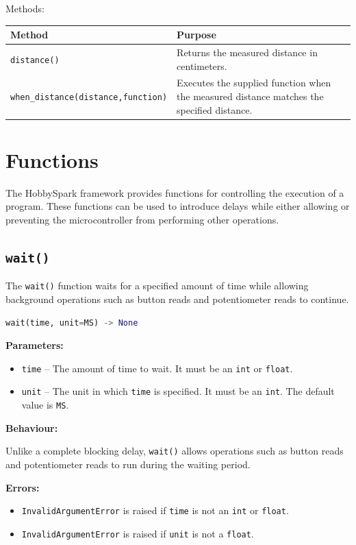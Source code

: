 Methods:

\begin{tabular}{ll}
	\toprule
	\textbf{Method} & \textbf{Purpose}\\
	\midrule
	\texttt{distance()} & Returns the measured distance in centimeters.\\
	\texttt{when\_distance(distance,function)} & Executes the supplied function when the measured distance matches the specified distance.\\
	\bottomrule
\end{tabular}
\newpage
\section{Functions}

The HobbySpark framework provides functions for controlling the execution of a
program. These functions can be used to introduce delays while either allowing
or preventing the microcontroller from performing other operations.

\subsection{\texttt{wait()}}

The \texttt{wait()} function waits for a specified amount of time while allowing
background operations such as button reads and potentiometer reads to continue.

\begin{lstlisting}[language=Python]
wait(time, unit=MS) -> None
\end{lstlisting}

\textbf{Parameters:}

\begin{itemize}
    \item \texttt{time} -- The amount of time to wait. It must be an
    \texttt{int} or \texttt{float}.
    
    \item \texttt{unit} -- The unit in which \texttt{time} is specified.
    It must be an \texttt{int}. The default value is \texttt{MS}.
\end{itemize}

\textbf{Behaviour:}

Unlike a complete blocking delay, \texttt{wait()} allows operations such as
button reads and potentiometer reads to run during the waiting period.

\textbf{Errors:}

\begin{itemize}
    \item \texttt{InvalidArgumentError} is raised if \texttt{time} is not an
    \texttt{int} or \texttt{float}.
    
    \item \texttt{InvalidArgumentError} is raised if \texttt{unit} is not a
    \texttt{float}.
\end{itemize}


